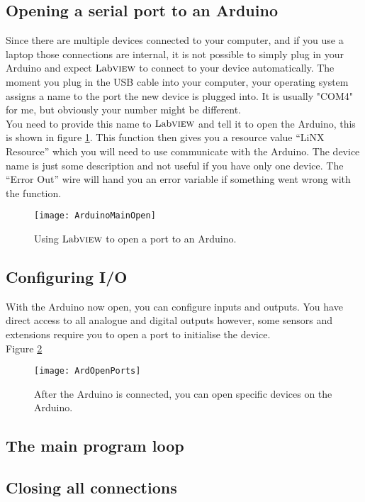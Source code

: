 \subsection{Opening a serial port to an Arduino}
Since there are multiple devices connected to your computer, and if you use a laptop those connections are internal, it is not possible to simply plug in your Arduino and expect $\text{Lab}\textsc{view}$ to connect to your device automatically. The moment you plug in the USB cable into your computer, your operating system assigns a name to the port the new device is plugged into. It is usually "COM4" for me, but obviously your number might be different.\\

You need to provide this name to $\text{Lab}\textsc{view}$ and tell it to open the Arduino, this is shown in figure \ref{OpenPort}. This function then gives you a resource value ``LiNX Resource''  which you will need to use communicate with the Arduino. The device name is just some description and not useful if you have only one device. The ``Error Out'' wire will hand you an error variable if something went wrong with the function.\\
\begin{figure}
	\centering
	\texttt{[image: ArduinoMainOpen]}
	\caption{Using $\text{Lab}\textsc{view}$ to open a port to an Arduino.}
	\label{OpenPort}
\end{figure}
\subsection{Configuring I/O}
With the Arduino now open, you can configure inputs and outputs. You have direct access to all analogue and digital outputs however, some sensors and extensions require you to open a port to initialise the device.\\

Figure \ref{OpenPorts}
\begin{figure}
	\centering
	\texttt{[image: ArdOpenPorts]}
	\caption{After the Arduino is connected, you can open specific devices on the Arduino.}
	\label{OpenPorts}
\end{figure}
\subsection{The main program loop} 
\subsection{Closing all connections}
